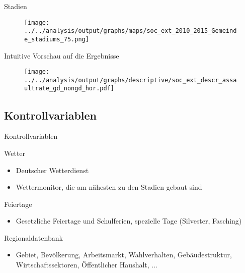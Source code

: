 \documentclass[usenames,dvipsnames,ngerman]{beamer} %
\begin{document}
	\begin{frame}{Stadien}
		\begin{figure}
			\texttt{[image: ../../analysis/output/graphs/maps/soc\_ext\_2010\_2015\_Gemeinde\_stadiums\_75.png]}
		\end{figure}
	\end{frame}

\begin{frame}{Intuitive Vorschau auf die Ergebnisse}
\begin{figure}
	\texttt{[image: ../../analysis/output/graphs/descriptive/soc\_ext\_descr\_assaultrate\_gd\_nongd\_hor.pdf]}
\end{figure}
\end{frame}


	\subsection{Kontrollvariablen}
	\begin{frame}{Kontrollvariablen}\label{link_weather_data}
		\begin{block}{Wetter}
			\begin{itemize}
				\item Deutscher Wetterdienst
				\item Wettermonitor, die am nähesten zu den Stadien gebaut sind \newline \hyperlink{link_map_stadiums}{} \hyperlink{link_hist_dist_monitor_stadiums}{}
			\end{itemize}
		\end{block}
		\begin{block}{Feiertage}
			\begin{itemize}
				\item Gesetzliche Feiertage und Schulferien, spezielle Tage (Silvester, Fasching)
			\end{itemize}	
		\end{block}
		\begin{block}{Regionaldatenbank}
			\begin{itemize}
				\item Gebiet, Bevölkerung, Arbeitsmarkt, Wahlverhalten, Gebäudestruktur, Wirtschaftssektoren, Öffentlicher Haushalt, ... 
			\end{itemize}
		\end{block}
	\end{frame}
\end{document}
